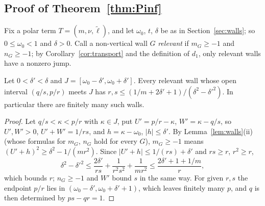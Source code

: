 \subsection{Proof of Theorem~\ref{thm:Pinf}}
Fix a polar term $T=(m,\nu,\tilde\ell)$, and let $\omega_0$, $t$, $\delta$ be as in Section~\ref{sec:walls}; so $0\le\omega_0<1$ and $\delta>0$. Call a non-vertical wall $G$ \emph{relevant} if $m_G\ge-1$ and $n_G\ge-1$; by Corollary~\ref{cor:transport} and the definition of $d_1$, only relevant walls have a nonzero jump.

\begin{lemma}\label{lem:finite}
Let $0<\delta'<\delta$ and $J=[\omega_0-\delta',\omega_0+\delta']$. Every relevant wall whose open interval $(q/s,p/r)$ meets $J$ has $r,s\le(1/m+2\delta'+1)/(\delta^2-\delta'^2)$. In particular there are finitely many such walls.
\end{lemma}

\begin{proof}
Let $q/s<\kappa<p/r$ with $\kappa\in J$, put $U'=p/r-\kappa$, $W'=\kappa-q/s$, so $U',W'>0$, $U'+W'=1/rs$, and $h=\kappa-\omega_0$, $|h|\le\delta'$. By Lemma~\ref{lem:walls}(ii) (whose formulas for $m_G$, $n_G$ hold for every $G$), $m_G\ge-1$ means $(U'+h)^2\ge\delta^2-1/(mr^2)$. Since $|U'+h|\le1/(rs)+\delta'$ and $rs\ge r$, $r^2\ge r$,
\[
\delta^2-\delta'^2\le\frac{2\delta'}{rs}+\frac1{r^2s^2}+\frac1{mr^2}\le\frac{2\delta'+1+1/m}{r},
\]
which bounds $r$; $n_G\ge-1$ and $W'$ bound $s$ in the same way. For given $r,s$ the endpoint $p/r$ lies in $(\omega_0-\delta',\omega_0+\delta'+1)$, which leaves finitely many $p$, and $q$ is then determined by $ps-qr=1$.
\end{proof}

